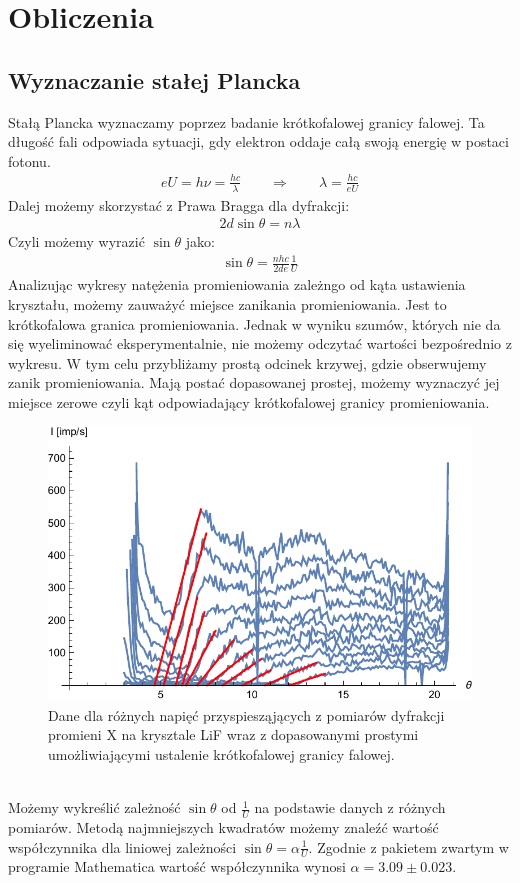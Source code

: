 \documentclass[paper=a4, fontsize=12pt]{scrartcl}
\begin{document}
\newpage
\section{Obliczenia}
\subsection{Wyznaczanie stałej Plancka}
Stałą Plancka wyznaczamy poprzez badanie krótkofalowej granicy falowej. Ta długość fali odpowiada sytuacji, gdy elektron oddaje całą swoją energię w postaci fotonu.
\begin{align*}
eU=h\nu=\frac{hc}{\lambda}\qquad\Rightarrow\qquad \lambda= \frac{hc}{eU}
\end{align*}
Dalej możemy skorzystać z Prawa Bragga dla dyfrakcji:
\begin{align*}
2d\sin\theta=n\lambda
\end{align*}
Czyli możemy wyrazić $\sin\theta$ jako:
\begin{align*}
\sin\theta=\frac{nhc}{2de}\frac{1}{U}
\end{align*}
Analizując wykresy natężenia promieniowania zależngo od kąta ustawienia kryształu, możemy zauważyć miejsce zanikania promieniowania. Jest to krótkofalowa granica promieniowania. Jednak w wyniku szumów, których nie da się wyeliminować eksperymentalnie, nie możemy odczytać wartości bezpośrednio z wykresu. W tym celu przybliżamy prostą odcinek krzywej, gdzie obserwujemy zanik promieniowania. Mają postać dopasowanej prostej, możemy wyznaczyć jej miejsce zerowe czyli kąt odpowiadający krótkofalowej granicy promieniowania.
\begin{figure}[h!]
\centering
\includegraphics[width=0.75\linewidth]{allfits}
\caption{Dane dla różnych napięć przyspiesząjących z pomiarów dyfrakcji promieni X na krysztale LiF wraz z dopasowanymi prostymi umożliwiającymi ustalenie krótkofalowej granicy falowej.}
\label{fig:allfits}
\end{figure}\\
Możemy wykreślić zależność $\sin\theta$ od $\frac{1}{U}$ na podstawie danych z różnych pomiarów. Metodą najmniejszych kwadratów możemy znaleźć wartość współczynnika dla liniowej zależności $\sin\theta=\alpha \frac{1}{U}$. Zgodnie z pakietem zwartym w programie Mathematica wartość współczynnika wynosi $\alpha=3.09\pm0.023$.
\end{document}
